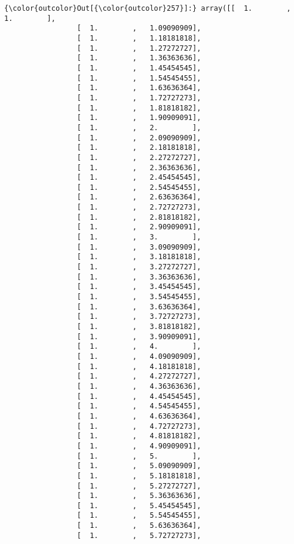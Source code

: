 \documentclass[11pt]{article}
\begin{document}
\begin{Verbatim}[commandchars=\\\{\}]
{\color{outcolor}Out[{\color{outcolor}257}]:} array([[  1.        ,   1.        ],
                 [  1.        ,   1.09090909],
                 [  1.        ,   1.18181818],
                 [  1.        ,   1.27272727],
                 [  1.        ,   1.36363636],
                 [  1.        ,   1.45454545],
                 [  1.        ,   1.54545455],
                 [  1.        ,   1.63636364],
                 [  1.        ,   1.72727273],
                 [  1.        ,   1.81818182],
                 [  1.        ,   1.90909091],
                 [  1.        ,   2.        ],
                 [  1.        ,   2.09090909],
                 [  1.        ,   2.18181818],
                 [  1.        ,   2.27272727],
                 [  1.        ,   2.36363636],
                 [  1.        ,   2.45454545],
                 [  1.        ,   2.54545455],
                 [  1.        ,   2.63636364],
                 [  1.        ,   2.72727273],
                 [  1.        ,   2.81818182],
                 [  1.        ,   2.90909091],
                 [  1.        ,   3.        ],
                 [  1.        ,   3.09090909],
                 [  1.        ,   3.18181818],
                 [  1.        ,   3.27272727],
                 [  1.        ,   3.36363636],
                 [  1.        ,   3.45454545],
                 [  1.        ,   3.54545455],
                 [  1.        ,   3.63636364],
                 [  1.        ,   3.72727273],
                 [  1.        ,   3.81818182],
                 [  1.        ,   3.90909091],
                 [  1.        ,   4.        ],
                 [  1.        ,   4.09090909],
                 [  1.        ,   4.18181818],
                 [  1.        ,   4.27272727],
                 [  1.        ,   4.36363636],
                 [  1.        ,   4.45454545],
                 [  1.        ,   4.54545455],
                 [  1.        ,   4.63636364],
                 [  1.        ,   4.72727273],
                 [  1.        ,   4.81818182],
                 [  1.        ,   4.90909091],
                 [  1.        ,   5.        ],
                 [  1.        ,   5.09090909],
                 [  1.        ,   5.18181818],
                 [  1.        ,   5.27272727],
                 [  1.        ,   5.36363636],
                 [  1.        ,   5.45454545],
                 [  1.        ,   5.54545455],
                 [  1.        ,   5.63636364],
                 [  1.        ,   5.72727273],

\end{Verbatim}
\end{document}
